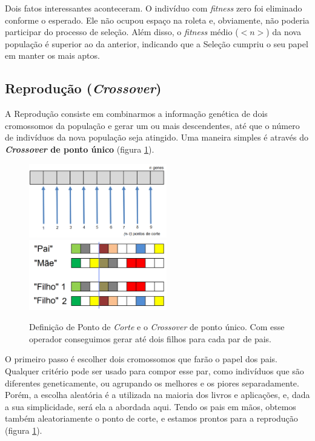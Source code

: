 	Dois fatos interessantes aconteceram. O indivíduo com \textit{fitness} zero foi eliminado conforme o esperado. Ele não ocupou espaço na roleta e, obviamente, não poderia participar do processo de seleção. Além disso, o \textit{fitness} médio ($<n>$) da nova população é superior ao da anterior, indicando que a Seleção cumpriu o seu papel em manter os mais aptos.
	
	
	\subsection{\label{crossover}Reprodução (\textit{Crossover})}

	A Reprodução consiste em combinarmos a informação genética de dois cromossomos da população e gerar um ou mais descendentes, até que o número de indivíduos da nova população seja atingido. Uma maneira simples é através do \textbf{\textit{Crossover} de ponto único} (figura \ref{figCrossOver}).
	
	\begin{figure}[htp]
		\begin{center}
			\includegraphics[width=6cm]{figs/ga/PontosCorte.png}
			\includegraphics[width=6cm]{figs/ga/CrossOver.png}
		\end{center}
		\caption{\label{figCrossOver}Definição de Ponto de \textit{Corte} e o \textit{Crossover} de ponto único. Com esse operador conseguimos gerar até dois filhos para cada par de pais.}
	\end{figure}
	
	O primeiro passo é escolher dois cromossomos que farão o papel dos pais. Qualquer critério pode ser usado para compor esse par, como indivíduos que são diferentes geneticamente, ou agrupando os melhores e os piores separadamente. Porém, a escolha aleatória é a utilizada na maioria dos livros e aplicações, e, dada a sua simplicidade, será ela a abordada aqui. Tendo os pais em mãos, obtemos também aleatoriamente o ponto de corte, e estamos prontos para a reprodução (figura \ref{figCrossOver}). 
	
